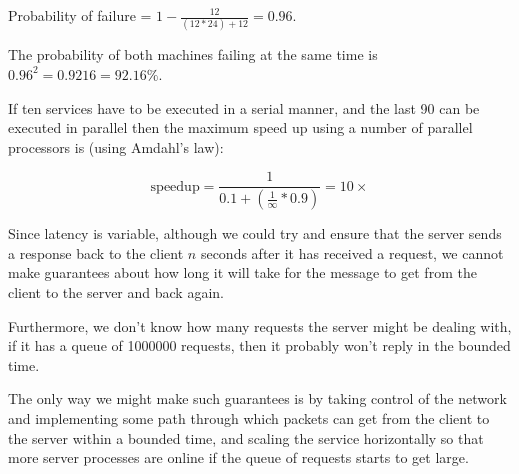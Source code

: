 
Probability of failure = $1 - \frac{12}{(12 * 24) + 12} = 0.96$.

The probability of both machines failing at the same time is $0.96^2 = 0.9216 =
92.16\%$.


If ten services have to be executed in a serial manner, and the last 90 can be
executed in parallel then the maximum speed up using a number of parallel
processors is (using Amdahl's law):

\[
  \text{speedup} = \frac{1}{0.1 + (\frac{1}{\infty} * 0.9)} = 10\times
\]


Since latency is variable, although we could try and ensure that the server
sends a response back to the client $n$ seconds after it has received a request,
we cannot make guarantees about how long it will take for the message to get
from the client to the server and back again.

Furthermore, we don't know how many requests the server might be dealing with, if
it has a queue of 1000000 requests, then it probably won't reply in the bounded
time.

The only way we might make such guarantees is by taking control of the network
and implementing some path through which packets can get from the client to the
server within a bounded time, and scaling the service horizontally so that more
server processes are online if the queue of requests starts to get large.

